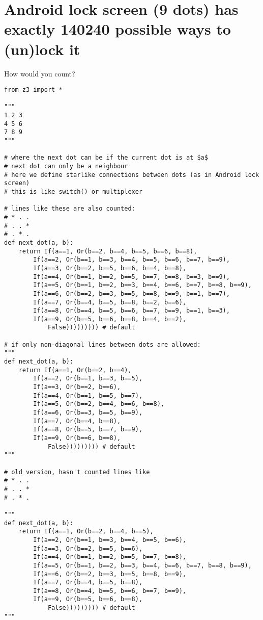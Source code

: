 \section{Android lock screen (9 dots) has exactly 140240 possible ways to (un)lock it}

How would you count?

\begin{lstlisting}[style=custompy]
from z3 import *

"""
1 2 3
4 5 6
7 8 9
"""

# where the next dot can be if the current dot is at $a$
# next dot can only be a neighbour
# here we define starlike connections between dots (as in Android lock screen)
# this is like switch() or multiplexer

# lines like these are also counted:
# * . .
# . . *
# . * .
def next_dot(a, b):
    return If(a==1, Or(b==2, b==4, b==5, b==6, b==8),
        If(a==2, Or(b==1, b==3, b==4, b==5, b==6, b==7, b==9),
        If(a==3, Or(b==2, b==5, b==6, b==4, b==8),
        If(a==4, Or(b==1, b==2, b==5, b==7, b==8, b==3, b==9),
        If(a==5, Or(b==1, b==2, b==3, b==4, b==6, b==7, b==8, b==9),
        If(a==6, Or(b==2, b==3, b==5, b==8, b==9, b==1, b==7),
        If(a==7, Or(b==4, b==5, b==8, b==2, b==6),
        If(a==8, Or(b==4, b==5, b==6, b==7, b==9, b==1, b==3),
        If(a==9, Or(b==5, b==6, b==8, b==4, b==2),
            False))))))))) # default

# if only non-diagonal lines between dots are allowed:
"""
def next_dot(a, b):
    return If(a==1, Or(b==2, b==4),
        If(a==2, Or(b==1, b==3, b==5),
        If(a==3, Or(b==2, b==6),
        If(a==4, Or(b==1, b==5, b==7),
        If(a==5, Or(b==2, b==4, b==6, b==8),
        If(a==6, Or(b==3, b==5, b==9),
        If(a==7, Or(b==4, b==8),
        If(a==8, Or(b==5, b==7, b==9),
        If(a==9, Or(b==6, b==8),
            False))))))))) # default
"""

# old version, hasn't counted lines like
# * . .
# . . *
# . * .

"""
def next_dot(a, b):
    return If(a==1, Or(b==2, b==4, b==5),
        If(a==2, Or(b==1, b==3, b==4, b==5, b==6),
        If(a==3, Or(b==2, b==5, b==6),
        If(a==4, Or(b==1, b==2, b==5, b==7, b==8),
        If(a==5, Or(b==1, b==2, b==3, b==4, b==6, b==7, b==8, b==9),
        If(a==6, Or(b==2, b==3, b==5, b==8, b==9),
        If(a==7, Or(b==4, b==5, b==8),
        If(a==8, Or(b==4, b==5, b==6, b==7, b==9),
        If(a==9, Or(b==5, b==6, b==8),
            False))))))))) # default
"""


\end{lstlisting}
